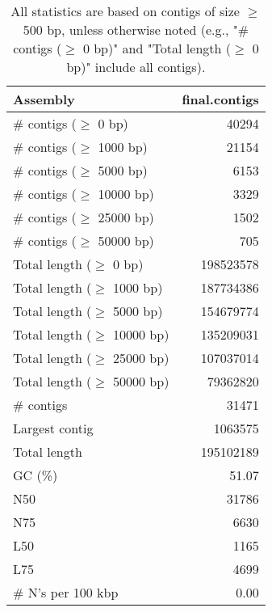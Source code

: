 \documentclass[12pt,a4paper]{article}
\begin{document}
\begin{table}[ht]
\begin{center}
\caption{All statistics are based on contigs of size $\geq$ 500 bp, unless otherwise noted (e.g., "\# contigs ($\geq$ 0 bp)" and "Total length ($\geq$ 0 bp)" include all contigs).}
\begin{tabular}{|l*{1}{|r}|}
\hline
Assembly & final.contigs \\ \hline
\# contigs ($\geq$ 0 bp) & 40294 \\ \hline
\# contigs ($\geq$ 1000 bp) & 21154 \\ \hline
\# contigs ($\geq$ 5000 bp) & 6153 \\ \hline
\# contigs ($\geq$ 10000 bp) & 3329 \\ \hline
\# contigs ($\geq$ 25000 bp) & 1502 \\ \hline
\# contigs ($\geq$ 50000 bp) & 705 \\ \hline
Total length ($\geq$ 0 bp) & 198523578 \\ \hline
Total length ($\geq$ 1000 bp) & 187734386 \\ \hline
Total length ($\geq$ 5000 bp) & 154679774 \\ \hline
Total length ($\geq$ 10000 bp) & 135209031 \\ \hline
Total length ($\geq$ 25000 bp) & 107037014 \\ \hline
Total length ($\geq$ 50000 bp) & 79362820 \\ \hline
\# contigs & 31471 \\ \hline
Largest contig & 1063575 \\ \hline
Total length & 195102189 \\ \hline
GC (\%) & 51.07 \\ \hline
N50 & 31786 \\ \hline
N75 & 6630 \\ \hline
L50 & 1165 \\ \hline
L75 & 4699 \\ \hline
\# N's per 100 kbp & 0.00 \\ \hline
\end{tabular}
\end{center}
\end{table}
\end{document}
